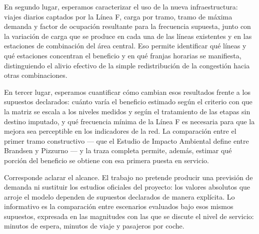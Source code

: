 \documentclass{article}
\begin{document}
En segundo lugar, esperamos caracterizar el uso de la nueva infraestructura: viajes diarios captados por la
Línea F, carga por tramo, tramo de máxima demanda y factor de ocupación resultante para la frecuencia
supuesta, junto con la variación de carga que se produce en cada una de las líneas existentes y en las
estaciones de combinación del área central. Eso permite identificar qué líneas y qué estaciones concentran
el beneficio y en qué franjas horarias se manifiesta, distinguiendo el alivio efectivo de la simple
redistribución de la congestión hacia otras combinaciones.

En tercer lugar, esperamos cuantificar cómo cambian esos resultados frente a los supuestos declarados:
cuánto varía el beneficio estimado según el criterio con que la matriz se escala a los niveles medidos y
según el tratamiento de las etapas sin destino imputado, y qué frecuencia mínima de la Línea F es necesaria
para que la mejora sea perceptible en los indicadores de la red. La comparación entre el primer tramo
constructivo --- que el Estudio de Impacto Ambiental define entre Brandsen y Pizzurno --- y la traza
completa permite, además, estimar qué porción del beneficio se obtiene con esa primera puesta en servicio.

Corresponde aclarar el alcance. El trabajo no pretende producir una previsión de demanda ni sustituir los
estudios oficiales del proyecto: los valores absolutos que arroje el modelo dependen de supuestos declarados
de manera explícita. Lo informativo es la comparación entre escenarios evaluados bajo esos mismos supuestos,
expresada en las magnitudes con las que se discute el nivel de servicio: minutos de espera, minutos de viaje
y pasajeros por coche.

\end{document}
